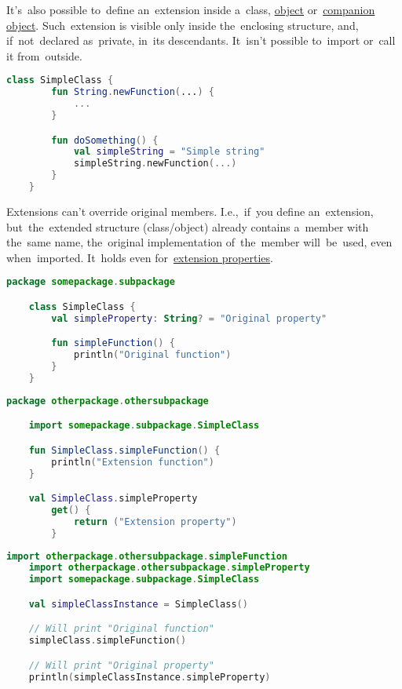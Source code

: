 \noindent It's~also possible to~define an~extension inside a~class, \hyperref[kotlinobject]{object} or~\hyperref[kotlincompanionobject]{companion object}.
Such~extension is visible only inside the~enclosing structure, and, if~not~declared as~private, in~its descendants.
It~isn't possible to~import or~call it from~outside.
\newpage

\begin{lstlisting}[language=Kotlin, title={Extension definition}]
    class SimpleClass {
        fun String.newFunction(...) {
            ...
        }

        fun doSomething() {
            val simpleString = "Simple string"
            simpleString.newFunction(...)
        }
    }
\end{lstlisting}

Extensions can't override original members.
I.e.,~if~you define an~extension, but~the~extended structure (class/object) already contains a~member with the~same name, the~original implementation of~the~member will~be~used, even when~imported.
It~holds even for~\hyperref[kotlinextensionproperty]{extension properties}.

\emtwen
\example
\begin{lstlisting}[language=Kotlin, title={Class with some members}]
    package somepackage.subpackage

    class SimpleClass {
        val simpleProperty: String? = "Original property"

        fun simpleFunction() {
            println("Original function")
        }
    }
\end{lstlisting}
\begin{lstlisting}[language=Kotlin, title={Extensions with same names}]
    package otherpackage.othersubpackage

    import somepackage.subpackage.SimpleClass

    fun SimpleClass.simpleFunction() {
        println("Extension function")
    }

    val SimpleClass.simpleProperty
        get() {
            return ("Extension property")
        }
\end{lstlisting}
\newpage

\begin{lstlisting}[language=Kotlin, title={Behavior}]
    import otherpackage.othersubpackage.simpleFunction
    import otherpackage.othersubpackage.simpleProperty
    import somepackage.subpackage.SimpleClass

    val simpleClassInstance = SimpleClass()

    // Will print "Original function"
    simpleClass.simpleFunction()

    // Will print "Original property"
    println(simpleClassInstance.simpleProperty)
\end{lstlisting}
\newline

